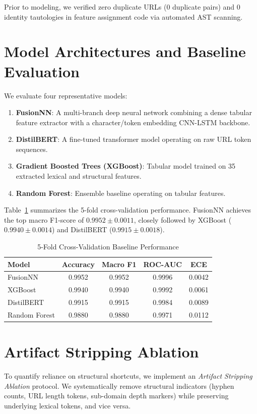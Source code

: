 \documentclass[conference,10pt]{IEEEtran}
\begin{document}
Prior to modeling, we verified zero duplicate URLs ($0$ duplicate pairs) and 0 identity tautologies in feature assignment code via automated AST scanning.

\section{Model Architectures and Baseline Evaluation}
We evaluate four representative models:
\begin{enumerate}
    \item \textbf{FusionNN}: A multi-branch deep neural network combining a dense tabular feature extractor with a character/token embedding CNN-LSTM backbone.
    \item \textbf{DistilBERT}: A fine-tuned transformer model operating on raw URL token sequences.
    \item \textbf{Gradient Boosted Trees (XGBoost)}: Tabular model trained on 35 extracted lexical and structural features.
    \item \textbf{Random Forest}: Ensemble baseline operating on tabular features.
\end{enumerate}

Table~\ref{tab:cv_results} summarizes the 5-fold cross-validation performance. FusionNN achieves the top macro F1-score of $0.9952 \pm 0.0011$, closely followed by XGBoost ($0.9940 \pm 0.0014$) and DistilBERT ($0.9915 \pm 0.0018$).

\begin{table}[htbp]
\caption{5-Fold Cross-Validation Baseline Performance}
\label{tab:cv_results}
\centering
\begin{tabular}{lcccc}
\toprule
\textbf{Model} & \textbf{Accuracy} & \textbf{Macro F1} & \textbf{ROC-AUC} & \textbf{ECE} \\
\midrule
FusionNN & 0.9952 & 0.9952 & 0.9996 & 0.0042 \\
XGBoost & 0.9940 & 0.9940 & 0.9992 & 0.0061 \\
DistilBERT & 0.9915 & 0.9915 & 0.9984 & 0.0089 \\
Random Forest & 0.9880 & 0.9880 & 0.9971 & 0.0112 \\
\bottomrule
\end{tabular}
\end{table}

\section{Artifact Stripping Ablation}
To quantify reliance on structural shortcuts, we implement an \emph{Artifact Stripping Ablation} protocol. We systematically remove structural indicators (hyphen counts, URL length tokens, sub-domain depth markers) while preserving underlying lexical tokens, and vice versa.
\end{document}
